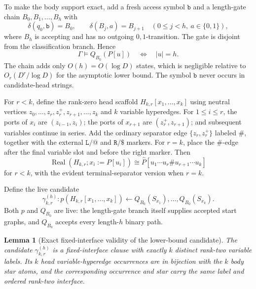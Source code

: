 \documentclass[11pt]{article}
\newtheorem{lemma}[theorem]{Lemma}
\theoremstyle{definition}
\theoremstyle{remark}
\newcommand{\Real}{\operatorname{Real}}
\begin{document}
To make the body support exact, add a fresh access symbol \(\mathtt b\) and a
length-gate chain
\(B_0,B_1,\ldots,B_h\)
with
\[
\delta(q_0,\mathtt b)=B_0,
\qquad
\delta(B_j,a)=B_{j+1}
\quad(0\le j<h,\ a\in\{0,1\}),
\]
where \(B_h\) is accepting and has no outgoing \(0,1\)-transition.  The gate
is disjoint from the classification branch.  Hence
\begin{equation}
\label{eq:exact-length-gate}
\boxed{
\Gamma\models Q_{B_0}(P[u])
\quad\Longleftrightarrow\quad
|u|=h.
}
\end{equation}
The chain adds only \(O(h)=O(\log D)\) states, which is negligible relative to
\(O_r(D^r/\log D)\) for the asymptotic lower bound.  The symbol \(\mathtt b\)
never occurs in candidate-head strings.

For \(r<k\), define the rank-zero head scaffold
\(H_{k,r}[x_1,\ldots,x_k]\) using neutral vertices
\(z_0,\ldots,z_r,z_r^+,z_{r+1},\ldots,z_k\)
and \(k\) variable hyperedges. For \(1\le i\le r\), the ports of \(x_i\) are
\((z_{i-1},z_i)\); the ports of \(x_{r+1}\) are
\((z_r^+,z_{r+1})\); and subsequent variables continue in series. Add the
ordinary separator edge \(\{z_r,z_r^+\}\) labeled \(\#\), together with the
external \(\mathtt L/\mathtt{@}\) and \(\mathtt R/\mathtt{\$}\) markers.
For \(r=k\), place the \(\#\)-edge after the final variable slot and before
the right marker. Then
\begin{equation}
\label{eq:lower-head-realization}
\Real(H_{k,r};x_i:=P[u_i])
\cong
\widehat P[u_1\cdots u_r\#u_{r+1}\cdots u_k]
\end{equation}
for \(r<k\), with the evident terminal-separator version when \(r=k\).

Define the live candidate
\begin{equation}
\label{eq:lower-bound-candidate}
\gamma_{k,r}^{(h)}:
p(H_{k,r}[x_1,\ldots,x_k])
\leftarrow
Q_{B_0}(S_{x_1}),\ldots,Q_{B_0}(S_{x_k}).
\end{equation}
Both \(p\) and \(Q_{B_0}\) are live: the length-gate branch itself supplies
accepted start graphs, and \(Q_{B_0}\) accepts every length-\(h\) binary path.

\begin{lemma}[Exact fixed-interface validity of the lower-bound candidate]
\label{lem:lower-syntax}
The candidate \(\gamma_{k,r}^{(h)}\) is a fixed-interface clause with exactly
\(k\) distinct rank-two variable labels.  Its \(k\) head
variable-hyperedge occurrences are in bijection with the \(k\) body star
atoms, and the corresponding occurrence and star carry the same label and
ordered rank-two interface.
\end{lemma}
\end{document}
